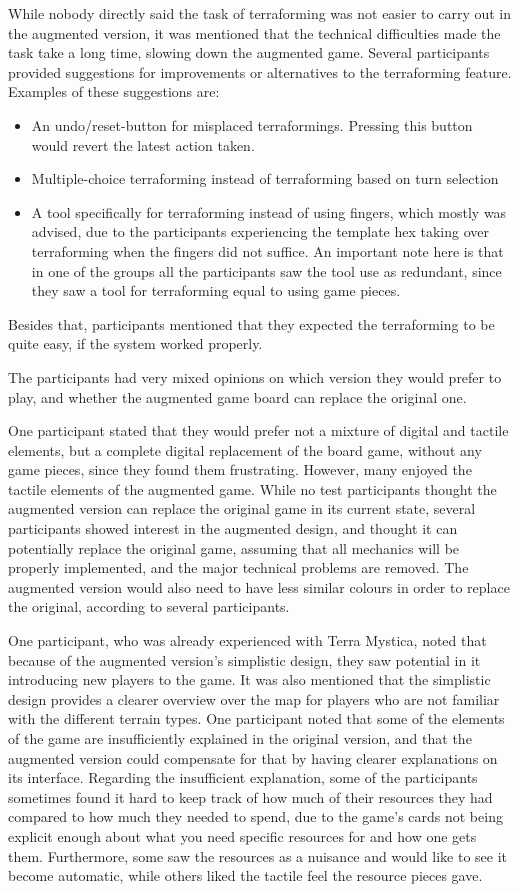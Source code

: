 While nobody directly said the task of terraforming was not easier to carry out in the augmented version, it was mentioned that the technical difficulties made the task take a long time, slowing down the augmented game. Several participants provided suggestions for improvements or alternatives to the terraforming feature. Examples of these suggestions are:
\begin{itemize}
\item An undo/reset-button for misplaced terraformings. Pressing this button would revert the latest action taken.
\item Multiple-choice terraforming instead of terraforming based on turn selection
\item A tool specifically for terraforming instead of using fingers, which mostly was advised, due to the participants experiencing the template hex taking over terraforming when the fingers did not suffice. An important note here is that in one of the groups all the participants saw the tool use as redundant, since they saw a tool for terraforming equal to using game pieces.
\end{itemize}
Besides that, participants mentioned that they expected the terraforming to be quite easy, if the system worked properly. 

The participants had very mixed opinions on which version they would prefer to play, and whether the augmented game board can replace the original one.

One participant stated that they would prefer not a mixture of digital and tactile elements, but a complete digital replacement of the board game, without any game pieces, since they found them frustrating. However, many enjoyed the tactile elements of the augmented game. While no test participants thought the augmented version can replace the original game in its current state, several participants showed interest in the augmented design, and thought it can potentially replace the original game, assuming that all mechanics will be properly implemented, and the major technical problems are removed. The augmented version would also need to have less similar colours in order to replace the original, according to several participants.

One participant, who was already experienced with Terra Mystica, noted that because of the augmented version’s simplistic design, they saw potential in it introducing new players to the game. It was also mentioned that the simplistic design provides a clearer overview over the map for players who are not familiar with the different terrain types. One participant noted that some of the elements of the game are insufficiently explained in the original version, and that the augmented version could compensate for that by having clearer explanations on its interface.  Regarding the insufficient explanation, some of the participants sometimes found it hard to keep track of how much of their resources they had compared to how much they needed to spend, due to the game's cards not being explicit enough about what you need specific resources for and how one gets them. Furthermore, some saw the resources as a nuisance and would like to see it become automatic, while others liked the tactile feel the resource pieces gave.

